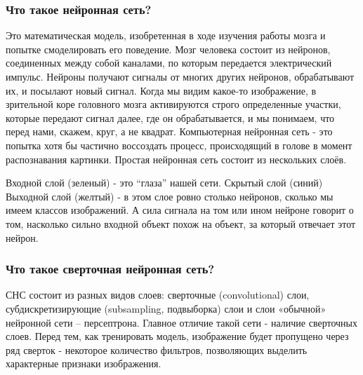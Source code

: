 \subsubsection{Что такое нейронная сеть?}
Это математическая модель, изобретенная в ходе изучения работы мозга и попытке смоделировать его поведение. 
Мозг человека состоит из нейронов, соединенных между собой каналами, по которым передается электрический импульс. Нейроны получают сигналы от многих других нейронов, обрабатывают их, и посылают новый сигнал. 
Когда мы видим какое-то изображение, в зрительной коре головного мозга активируются строго определенные участки, которые передают сигнал далее, где он обрабатывается, и мы понимаем, что перед нами, скажем, круг, а не квадрат.
Компьютерная нейронная сеть - это попытка хотя бы частично воссоздать процесс, происходящий в голове в момент распознавания картинки.  Простая нейронная сеть состоит из нескольких слоёв. 
\begin{figure}[H]
\end{figure}

Входной слой (зеленый) - это “глаза” нашей сети.
 Скрытый слой (синий)
Выходной слой (желтый) - в этом слое ровно столько нейронов, сколько мы имеем классов изображений. А сила сигнала на том или ином нейроне говорит о том, насколько сильно входной объект похож на объект, за который отвечает этот нейрон.
\subsubsection{Что такое сверточная нейронная сеть?}
СНС состоит из разных видов слоев: сверточные (convolutional) слои, субдискретизирующие (subsampling, подвыборка) слои и слои «обычной» нейронной сети – персептрона.
Главное отличие такой сети - наличие сверточных слоев. Перед тем, как тренировать модель, изображение будет пропущено через ряд сверток - некоторое количество фильтров, позволяющих выделить характерные признаки изображения.
